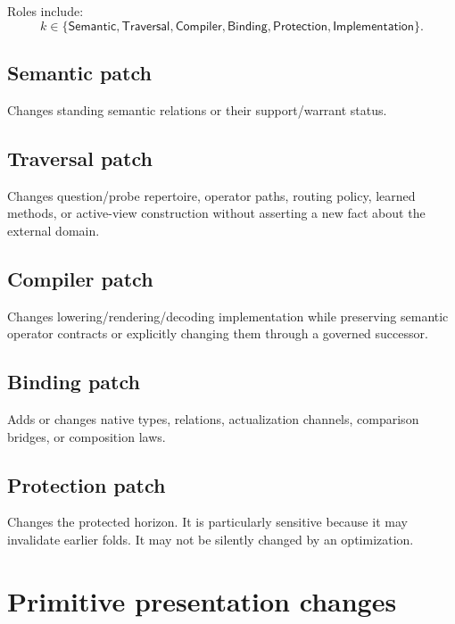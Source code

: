 \documentclass[11pt,oneside]{article}
\begin{document}
Roles include:
\[
k\in
\{
\mathsf{Semantic},
\mathsf{Traversal},
\mathsf{Compiler},
\mathsf{Binding},
\mathsf{Protection},
\mathsf{Implementation}
\}.
\]

\subsection{Semantic patch}

Changes standing semantic relations or their support/warrant status.

\subsection{Traversal patch}

Changes question/probe repertoire, operator paths, routing policy, learned methods, or active-view construction without asserting a new fact about the external domain.

\subsection{Compiler patch}

Changes lowering/rendering/decoding implementation while preserving semantic operator contracts or explicitly changing them through a governed successor.

\subsection{Binding patch}

Adds or changes native types, relations, actualization channels, comparison bridges, or composition laws.

\subsection{Protection patch}

Changes the protected horizon.  It is particularly sensitive because it may invalidate earlier folds.  It may not be silently changed by an optimization.

\section{Primitive presentation changes}
\end{document}
